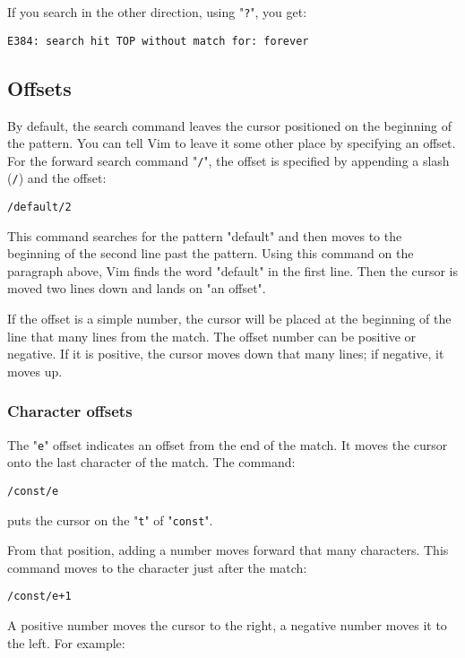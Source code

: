 If you search in the other direction, using "\texttt{?}", you get:

\begin{Verbatim}[samepage=true]
    E384: search hit TOP without match for: forever 
\end{Verbatim}
\subsection{Offsets}
By default, the search command leaves the cursor positioned on the beginning of the pattern.
You can tell Vim to leave it some other place by specifying an offset.
For the forward search command "\texttt{/}", the offset is specified by appending a slash (\texttt{/}) and the offset:

\begin{Verbatim}[samepage=true]
 /default/2
\end{Verbatim}

This command searches for the pattern "default" and then moves to the beginning of the second line past the pattern.
Using this command on the paragraph above, Vim finds the word "default" in the first line.
Then the cursor is moved two lines down and lands on "an offset".

If the offset is a simple number, the cursor will be placed at the beginning of the line that many lines from the match.
The offset number can be positive or negative.
If it is positive, the cursor moves down that many lines; if negative, it moves up.

\subsubsection{Character offsets}
The "\texttt{e}" offset indicates an offset from the end of the match.
It moves the cursor onto the last character of the match.
The command:

\begin{Verbatim}[samepage=true]
 /const/e
\end{Verbatim}

puts the cursor on the "\texttt{t}" of "\texttt{const}".

From that position, adding a number moves forward that many characters.
This command moves to the character just after the match:

\begin{Verbatim}[samepage=true]
 /const/e+1
\end{Verbatim}

A positive number moves the cursor to the right, a negative number moves it to the left.
For example:

